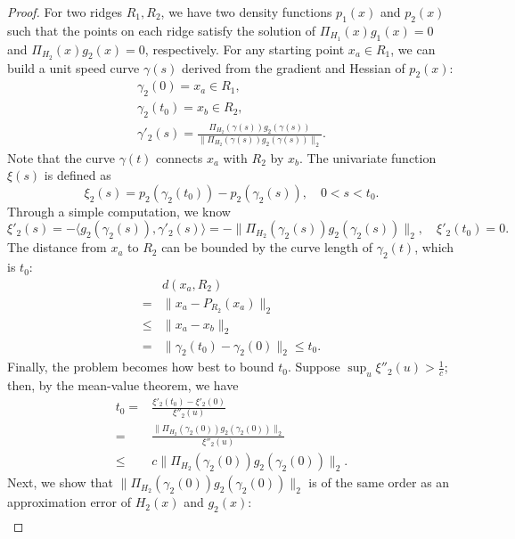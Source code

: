 \documentclass[aos,preprint]{imsart}
\theoremstyle{remark}
\begin{document}
\begin{appendix}
\begin{proof}\label{Ridge Derivative Lemma}
For two ridges $R_1, R_2$, we have two density functions $p_1(x)$ and $p_2(x)$ such that the points on each ridge satisfy the solution of
 $\Pi_{H_1}(x) g_1(x) = 0$ 
 and $\Pi_{H_2}(x) g_2(x) = 0$, respectively. For any starting point $x_a \in R_1$, we can build a unit speed curve $\gamma(s)$ derived from the gradient and Hessian of $p_2(x)$:
 \begin{gather*}
 \gamma_2(0) = x_a \in R_1,\\
 \gamma_2(t_0) = x_b \in R_2,\\
 \gamma'_2(s) = \frac{\Pi_{H_2}(\gamma(s))g_2(\gamma(s))}{\|\Pi_{H_2}(\gamma(s))g_2(\gamma(s))\|_2}.
 \end{gather*}
Note that the curve $\gamma(t)$ connects $x_a$ with $R_2$ by $x_b$. The univariate function $\xi(s)$ is defined as
  \[
  \xi_2(s) = p_2(\gamma_2(t_0))-p_2(\gamma_2(s)), \quad 0<s<t_0.
  \]
Through a simple computation, we know 
 \[
 \xi'_2(s)=-\langle  g_2(\gamma_2(s)), \gamma'_2(s) \rangle =- \|\Pi_{H_2}(\gamma_2(s))g_2(\gamma_2(s))\|_2, \quad \xi'_2(t_0) = 0.
 \]
 The distance from $x_a$ to $R_2$ can be bounded by the curve length of $\gamma_2(t)$, which is $t_0$:
 \[
 \begin{aligned}
 &d(x_a, R_2) \\
 =& \|x_a-P_{R_2}(x_a)\|_2\\
 \leq& \|x_a-x_b\|_2 \\
 = &\|\gamma_2(t_0)-\gamma_2(0)\|_2\leq t_0.
 \end{aligned}
 \]
Finally, the problem becomes how best to bound $t_0$. Suppose $\sup_u \xi''_2(u)>\frac{1}{c}$; then, by the mean-value theorem, we have
 \[
 \begin{aligned}
 t_0 = &\frac{\xi'_2(t_0)-\xi'_2(0)}{\xi''_2(u)} \\
 = &\frac{\|\Pi_{H_2}(\gamma_2(0))g_2(\gamma_2(0))\|_2}{\xi''_2(u)} \\
 \leq & c \|\Pi_{H_2}(\gamma_2(0))g_2(\gamma_2(0))\|_2.
 \end{aligned}
 \]
 Next, we show that $\|\Pi_{H_2}(\gamma_2(0))g_2(\gamma_2(0))\|_2$ is of the same order as an approximation error of $H_2(x)$ and $g_2(x)$:
 \begin{equation}
 \begin{aligned}\label{bound_temp1}

\end{aligned}
\end{equation}
\end{proof}
\end{appendix}
\end{document}
